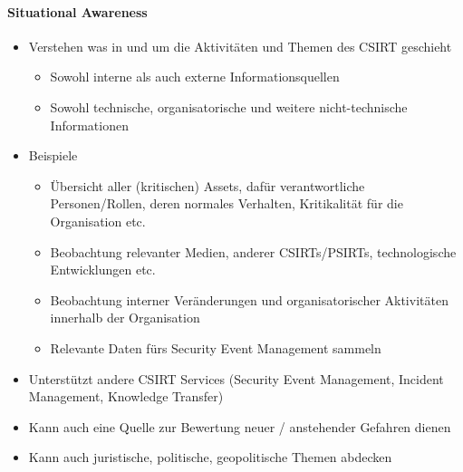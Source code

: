 \paragraph{Situational Awareness}
\begin{itemize}
    \item Verstehen was in und um die Aktivitäten und Themen des CSIRT geschieht
    \begin{itemize}
        \item Sowohl interne als auch externe Informationsquellen
        \item Sowohl technische, organisatorische und weitere nicht-technische Informationen
    \end{itemize}
    \item Beispiele
    \begin{itemize}
        \item Übersicht aller (kritischen) Assets, dafür verantwortliche Personen/Rollen, deren normales Verhalten, Kritikalität für die Organisation etc.
        \item Beobachtung relevanter Medien, anderer CSIRTs/PSIRTs, technologische Entwicklungen etc.
        \item Beobachtung interner Veränderungen und organisatorischer Aktivitäten innerhalb der Organisation
        \item Relevante Daten fürs Security Event Management sammeln
    \end{itemize}
    \item Unterstützt andere CSIRT Services (Security Event Management, Incident Management, Knowledge Transfer)
    \item Kann auch eine Quelle zur Bewertung neuer / anstehender Gefahren dienen
    \item Kann auch juristische, politische, geopolitische Themen abdecken
\end{itemize}

